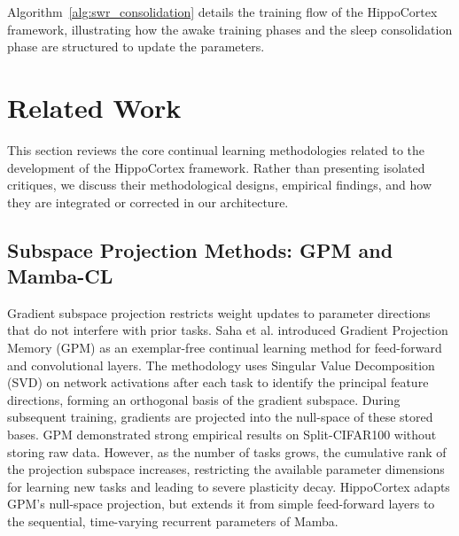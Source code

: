 Algorithm~\ref{alg:swr_consolidation} details the training flow of the HippoCortex framework, illustrating how the awake training phases and the sleep consolidation phase are structured to update the parameters.



\section{Related Work}
\label{sec:related_work}

This section reviews the core continual learning methodologies related to the development of the HippoCortex framework. Rather than presenting isolated critiques, we discuss their methodological designs, empirical findings, and how they are integrated or corrected in our architecture.

\subsection{Subspace Projection Methods: GPM and Mamba-CL}

Gradient subspace projection restricts weight updates to parameter directions that do not interfere with prior tasks. Saha et al. \cite{sahaGradientProjectionMemory2021} introduced Gradient Projection Memory (GPM) as an exemplar-free continual learning method for feed-forward and convolutional layers. The methodology uses Singular Value Decomposition (SVD) on network activations after each task to identify the principal feature directions, forming an orthogonal basis of the gradient subspace. During subsequent training, gradients are projected into the null-space of these stored bases. GPM demonstrated strong empirical results on Split-CIFAR100 without storing raw data. However, as the number of tasks grows, the cumulative rank of the projection subspace increases, restricting the available parameter dimensions for learning new tasks and leading to severe plasticity decay. HippoCortex adapts GPM's null-space projection, but extends it from simple feed-forward layers to the sequential, time-varying recurrent parameters of Mamba.


